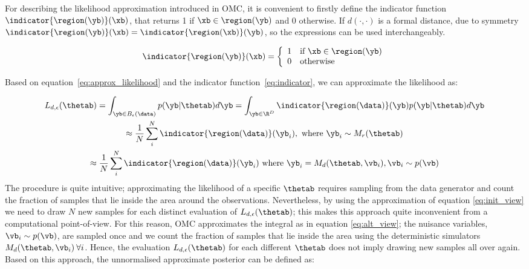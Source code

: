 For describing the likelihood approximation introduced in OMC, it is
convenient to firstly define the indicator function
$\indicator{\region(\yb)}(\xb)$, that returns 1 if
$\xb \in \region(\yb)$ and 0 otherwise. If $d(\cdot,\cdot)$ is a
formal distance, due to symmetry
$\indicator{\region(\yb)}(\xb) = \indicator{\region(\xb)}(\yb)$, so
the expressions can be used interchangeably.

\begin{gather} \label{eq:indicator} \indicator{\region(\yb)}(\xb)=
  \left\{
    \begin{array}{ll}
      1 & \mbox{if } \xb \in \region(\yb) \\
      0 & \mbox{otherwise} 
    \end{array} \right. \end{gather}

\noindent
Based on equation~\eqref{eq:approx_likelihood} and the indicator
function~\eqref{eq:indicator}, we can approximate the likelihood as:

\begin{gather} \label{eq:approx_likelihood_omc}
  L_{d, \epsilon}(\thetab) =
  \int_{\yb \in B_\epsilon(\data)}p(\yb|\thetab)d\yb =
  \int_{\yb \in \R^D} \indicator{\region(\data)}(\yb)p(\yb|\thetab)d\yb\\
  \approx \frac{1}{N} \sum_i^N \indicator{\region(\data)}(\yb_i),\text{ where }
  \yb_i \sim M_r(\thetab) \label{eq:init_view}\\
  \approx \frac{1}{N} \sum_i^N \indicator{\region (\data)} (\yb_i)
  \text{ where } \yb_i = M_d(\thetab, \vb_i), \vb_i \sim p(\vb) \label{eq:alt_view}
\end{gather}
%
The procedure is quite intuitive; approximating the likelihood of a
specific $\thetab$ requires sampling from the data generator and count
the fraction of samples that lie inside the area around the
observations. Nevertheless, by using the approximation of equation
\eqref{eq:init_view} we need to draw $N$ new samples for each distinct
evaluation of $L_{d,\epsilon}(\thetab)$; this makes this approach
quite inconvenient from a computational point-of-view. For this
reason, OMC approximates the integral as in equation
\eqref{eq:alt_view}; the nuisance variables, $\vb_i \sim p(\vb)$, are
sampled once and we count the fraction of samples that lie inside the
area using the deterministic simulators
$M_d(\thetab, \vb_i) \: \forall i$. Hence, the evaluation
$L_{d,\epsilon}(\thetab)$ for each different $\thetab$ does not imply
drawing new samples all over again. Based on this approach, the
unnormalised approximate posterior can be defined as:

